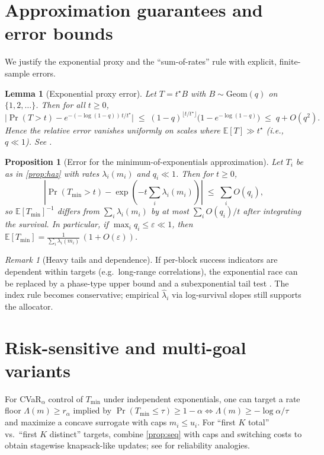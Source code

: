 \documentclass[11pt]{article}
\newtheorem{proposition}[theorem]{Proposition}
\newtheorem{lemma}[theorem]{Lemma}
\theoremstyle{definition}
\theoremstyle{remark}
\newtheorem{remark}[theorem]{Remark}
\newcommand{\E}{\mathbb{E}}
\newcommand{\1}{\mathbbm{1}}
\begin{document}
\section{Approximation guarantees and error bounds}\label{sec:err}
We justify the exponential proxy and the ``sum-of-rates'' rule with explicit, finite-sample errors.

\begin{lemma}[Exponential proxy error]
Let $T=t^\star B$ with $B\sim\mathrm{Geom}(q)$ on $\{1,2,\dots\}$. Then for all $t\ge 0$,
\[
\Big|\Pr(T>t)-e^{-( -\log(1-q))\,t/t^\star}\Big|
\;\le\; (1-q)^{\lfloor t/t^\star\rfloor}\Big(1-e^{-\log(1-q)}\Big)
\;\le\; q + O(q^2).
\]
Hence the relative error vanishes uniformly on scales where $\E[T]\gg t^\star$ (i.e., $q\ll1$). See \textcite{AsmussenGlynn2007,Ross2014}.
\end{lemma}

\begin{proposition}[Error for the minimum-of-exponentials approximation]
Let $T_i$ be as in \cref{prop:haz} with rates $\lambda_i(m_i)$ and $q_i\ll 1$. Then for $t\ge 0$,
\[
\left|\Pr(T_{\min}>t)-\exp\!\left(-t\sum_i \lambda_i(m_i)\right)\right|
\;\le\; \sum_i O(q_i),
\]
so $\E[T_{\min}]^{-1}$ differs from $\sum_i \lambda_i(m_i)$ by at most $\sum_i O(q_i)/t$ after integrating the survival. In particular, if $\max_i q_i\le \varepsilon\ll 1$, then $\E[T_{\min}]=\frac{1}{\sum_i \lambda_i(m_i)}\,(1+O(\varepsilon))$.
\end{proposition}

\begin{remark}[Heavy tails and dependence]
If per-block success indicators are dependent within targets (e.g.\ long-range correlations), the exponential race can be replaced by a phase-type upper bound and a subexponential tail test \parencite{AsmussenGlynn2007}. The index rule becomes conservative; empirical $\hat\lambda_i$ via log-survival slopes still supports the allocator.
\end{remark}

\section{Risk-sensitive and multi-goal variants}
For CVaR$_\alpha$ control of $T_{\min}$ under independent exponentials, one can target a rate floor $\Lambda(m)\ge r_\alpha$ implied by $\Pr(T_{\min}\le \tau)\ge 1-\alpha \iff \Lambda(m)\ge -\log\alpha/\tau$ and maximize a concave surrogate with caps $m_i\le u_i$. For ``first $K$ total'' vs.\ ``first $K$ distinct'' targets, combine \cref{prop:seq} with caps and switching costs to obtain stagewise knapsack-like updates; see \textcite{BarlowProschan1965} for reliability analogies.
\end{document}
